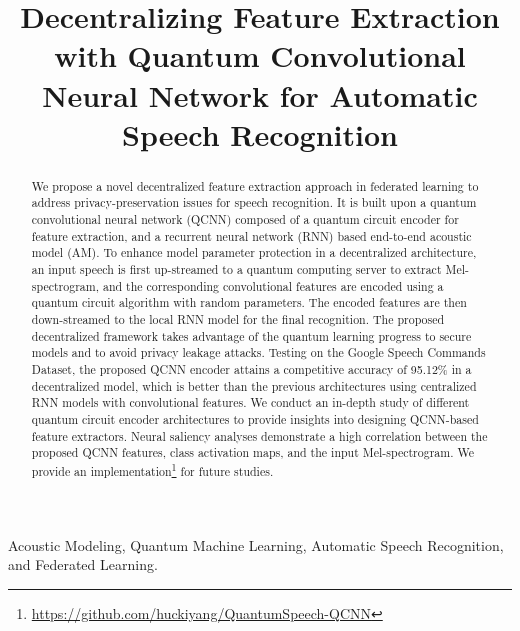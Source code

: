 \documentclass{article}
\title{Decentralizing Feature Extraction with Quantum Convolutional Neural Network for Automatic Speech Recognition}
\begin{document}
\ninept
\maketitle
\begin{abstract}
We propose a novel decentralized feature extraction approach in federated learning to address privacy-preservation issues for speech recognition. It is built upon a quantum convolutional neural network (QCNN) composed of a quantum circuit encoder for feature extraction, and a recurrent neural network (RNN) based end-to-end acoustic model (AM). To enhance model parameter protection in a decentralized architecture, an input speech is first up-streamed to a quantum computing server to extract Mel-spectrogram, and the corresponding convolutional features are encoded using a quantum circuit algorithm with random parameters. The encoded features are then down-streamed to the local RNN model for the final recognition. The proposed decentralized framework takes advantage of the quantum learning progress to secure models and to avoid privacy leakage attacks. Testing on the Google Speech Commands Dataset, the proposed QCNN encoder attains a competitive accuracy of 95.12\% in a decentralized model, which is better than the previous architectures using centralized RNN models with convolutional features. We conduct an in-depth study of different quantum circuit encoder architectures to provide insights into designing QCNN-based feature extractors. Neural saliency analyses demonstrate a high correlation between the proposed QCNN features, class activation maps, and the input Mel-spectrogram. We provide an implementation\footnote{\href{https://github.com/huckiyang/QuantumSpeech-QCNN}{https://github.com/huckiyang/QuantumSpeech-QCNN}} for future studies.



\end{abstract}
\begin{keywords}
Acoustic Modeling, Quantum Machine Learning, Automatic Speech Recognition, and Federated Learning.
\end{keywords}
\end{document}
